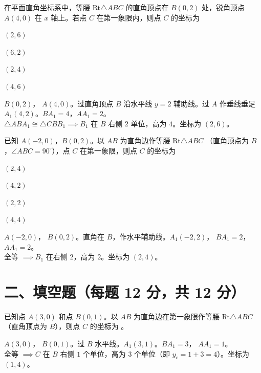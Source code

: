\documentclass{exam-zh}
\begin{document}
\begin{question}[points=12]
  在平面直角坐标系中，等腰 Rt$\triangle ABC$ 的直角顶点在 $B(0, 2)$ 处，锐角顶点 $A(4, 0)$ 在 $x$ 轴上。若点 $C$ 在第一象限内，则点 $C$ 的坐标为
  \begin{choices}
    \item $(2, 6)$
    \item $(6, 2)$
    \item $(2, 4)$
    \item $(4, 6)$
  \end{choices}
  \paren[A]
  \begin{solutionblock}
    $B(0,2)$， $A(4,0)$。过直角顶点 $B$ 沿水平线 $y=2$ 辅助线。过 $A$ 作垂线垂足 $A_1(4,2)$。$BA_1 = 4$，$AA_1 = 2$。\\ $\triangle ABA_1 \cong \triangle CBB_1 \implies B_1$ 在 $B$ 右侧 $2$ 单位，高为 $4$。坐标为 $(2, 6)$。
  \end{solutionblock}
\end{question}



\begin{question}[points=12]
  已知 $A(-2, 0)$，$B(0, 2)$。以 $AB$ 为直角边作等腰 Rt$\triangle ABC$ （直角顶点为 $B$，$\angle ABC = 90^\circ$），点 $C$ 在第一象限，则点 $C$ 的坐标为
  \begin{choices}
    \item $(2, 4)$
    \item $(4, 2)$
    \item $(2, 2)$
    \item $(4, 4)$
  \end{choices}
  \paren[A]
  \begin{solutionblock}
    $A(-2,0)$， $B(0,2)$。直角在 $B$，作水平辅助线。$A_1(-2,2)$， $BA_1 = 2$， $AA_1 = 2$。\\ 全等 $\implies B_1$ 在右侧 $2$，高为 $2$。坐标为 $(2, 4)$。
  \end{solutionblock}
\end{question}


\section*{二、填空题（每题 12 分，共 12 分）}


\begin{question}[points=12]
  已知点 $A(3, 0)$ 和点 $B(0, 1)$。以 $AB$ 为直角边在第一象限作等腰 Rt$\triangle ABC$ （直角顶点为 $B$），则点 $C$ 的坐标为 \fillin。
  \paren[$(1, 4)$]
  \begin{solutionblock}
    $A(3,0)$， $B(0,1)$。过 $B$ 水平线。$A_1(3,1)$。$BA_1 = 3$， $AA_1 = 1$。\\ 全等 $\implies C$ 在 $B$ 右侧 $1$ 个单位，高为 $3$ 个单位（即 $y_c = 1+3=4$）。坐标为 $(1, 4)$。
  \end{solutionblock}
\end{question}
\end{document}
